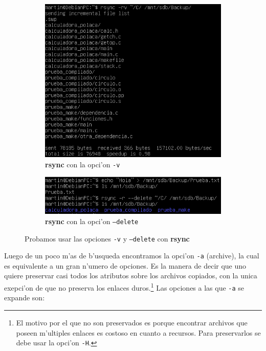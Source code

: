 \documentclass[11pt]{article}
\newcommand{\rsync}[0]{\textbf{rsync}}
\begin{document}
		\begin{figure}[h]
			\centering
			\begin{subfigure}{0.75\linewidth}
				\includegraphics[width=1\linewidth]{Images/rsync/rsync_backup_verbose.PNG}
				\caption{\rsync{} con la opci'on \texttt{-v}}
			\end{subfigure}
			\bigbreak
			\begin{subfigure}{0.7\linewidth}
				\includegraphics[width=1\linewidth]{Images/rsync/rsync_backup_delete.PNG}
				\caption{\rsync{} con la opci'on \texttt{--delete}}
			\end{subfigure}
			\caption{Probamos usar las opciones \texttt{-v} y \texttt{--delete} con \rsync{}}
			\label{fig:rsync_backup_options_1}
		\end{figure}

		Luego de un poco m'as de b'usqueda encontramos la opci'on \texttt{-a} (archive), la cual es equivalente a un gran n'umero de opciones. Es la manera de decir que uno quiere preservar casi todos los atributos sobre los archivos copiados, con la unica exepci'on de que no preserva los enlaces duros.\footnote{El motivo por el que no son preservados es porque encontrar archivos que poseen m'ultiples enlaces es costoso en cuanto a recursos. Para preservarlos se debe usar la opci'on \texttt{-H}.} Las opciones a las que \texttt{-a} se expande son:
\end{document}
